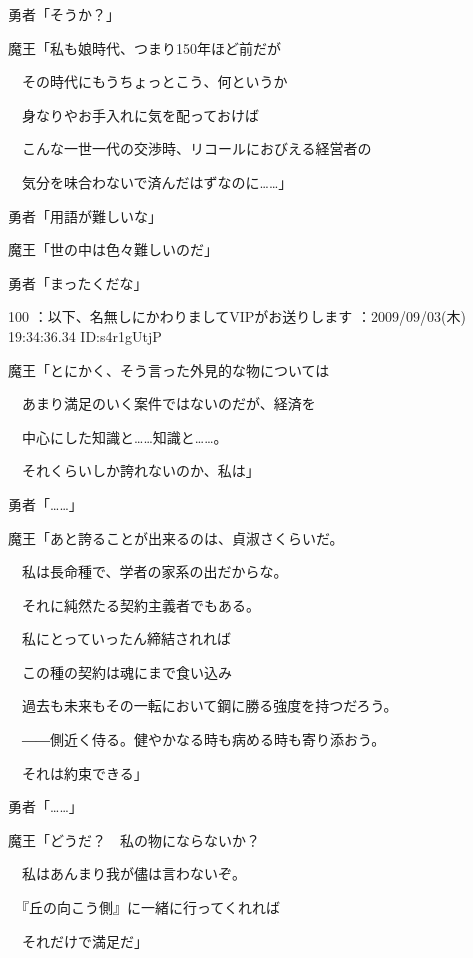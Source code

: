 \documentclass[a4j,twocolumn]{tarticle}
\begin{document}
勇者「そうか？」 



魔王「私も娘時代、つまり150年ほど前だが\par{} 
　その時代にもうちょっとこう、何というか\par{} 
　身なりやお手入れに気を配っておけば\par{} 
　こんな一世一代の交渉時、リコールにおびえる経営者の\par{} 
　気分を味合わないで済んだはずなのに……」 



勇者「用語が難しいな」 



魔王「世の中は色々難しいのだ」 



勇者「まったくだな」 

	
    
    

100 ：以下、名無しにかわりましてVIPがお送りします ：2009/09/03(木) 19:34:36.34 ID:s4r1gUtjP


魔王「とにかく、そう言った外見的な物については\par{} 
　あまり満足のいく案件ではないのだが、経済を\par{} 
　中心にした知識と……知識と……。\par{} 
　それくらいしか誇れないのか、私は」 



勇者「……」 



魔王「あと誇ることが出来るのは、貞淑さくらいだ。\par{} 
　私は長命種で、学者の家系の出だからな。\par{} 
　それに純然たる契約主義者でもある。\par{} 
　私にとっていったん締結されれば\par{} 
　この種の契約は魂にまで食い込み\par{} 
　過去も未来もその一転において鋼に勝る強度を持つだろう。\par{} 
　――側近く侍る。健やかなる時も病める時も寄り添おう。\par{} 
　それは約束できる」 



勇者「……」 



魔王「どうだ？　私の物にならないか？\par{} 
　私はあんまり我が儘は言わないぞ。\par{} 
　『丘の向こう側』に一緒に行ってくれれば\par{} 
　それだけで満足だ」
\end{document}
